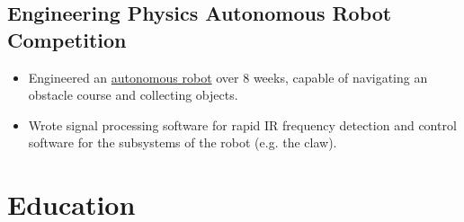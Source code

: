 \documentclass[a4paper, 10pt]{article}
\begin{document}
\subsection*{Engineering Physics Autonomous Robot Competition}
\begin{itemize}
    \item Engineered an \href{https://axel-jacobsen.github.io/ENPHRobot/}{autonomous robot} over 8 weeks, capable of navigating an obstacle course and collecting objects.
    \item Wrote signal processing software for rapid IR frequency detection and control software for the subsystems of the robot (e.g. the claw).
\end{itemize}

\section*{Education}





\end{document}
